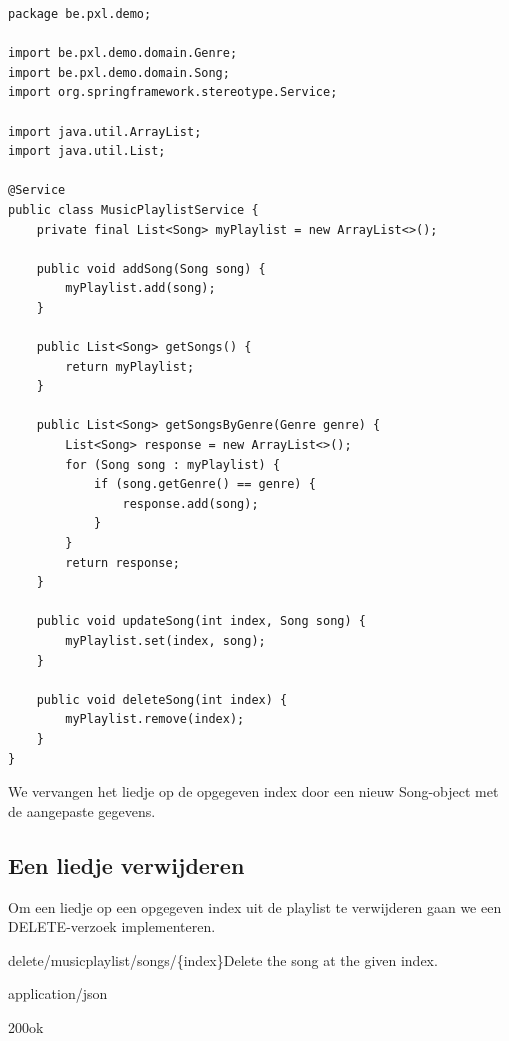 \begin{lstlisting}
package be.pxl.demo;

import be.pxl.demo.domain.Genre;
import be.pxl.demo.domain.Song;
import org.springframework.stereotype.Service;

import java.util.ArrayList;
import java.util.List;

@Service
public class MusicPlaylistService {
	private final List<Song> myPlaylist = new ArrayList<>();

	public void addSong(Song song) {
		myPlaylist.add(song);
	}

	public List<Song> getSongs() {
		return myPlaylist;
	}

	public List<Song> getSongsByGenre(Genre genre) {
		List<Song> response = new ArrayList<>();
		for (Song song : myPlaylist) {
			if (song.getGenre() == genre) {
				response.add(song);
			}
		}
		return response;
	}

	public void updateSong(int index, Song song) {
		myPlaylist.set(index, song);
	}

	public void deleteSong(int index) {
		myPlaylist.remove(index);
	}
}
\end{lstlisting}

We vervangen het liedje op de opgegeven index door een nieuw Song-object met de aangepaste gegevens.

\subsection{Een liedje verwijderen}

Om een liedje op een opgegeven index uit de playlist te verwijderen gaan we een DELETE-verzoek implementeren.


\begin{apiRoute}{delete}{/musicplaylist/songs/\{index\}}{Delete the song at the given index.}
\begin{routeParameter}
\end{routeParameter}
\begin{routeResponse}{application/json}
\begin{routeResponseItem}{200}{ok}
\end{routeResponseItem}
\end{routeResponse}
\end{apiRoute}

